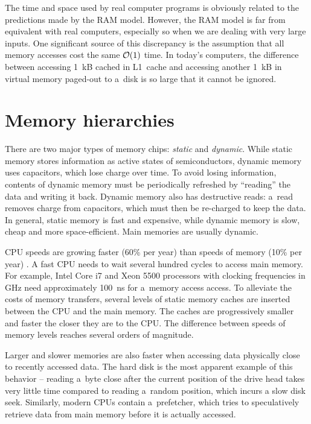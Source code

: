 The time and space used by real computer programs is obviously related
to the predictions made by the RAM model. However, the RAM model is far
from equivalent with real computers, especially so when we are dealing with
very large inputs. One significant source of this discrepancy is the assumption
that all memory accesses cost the same $\mathcal{O}(1)$ time. In today's computers,
the difference between accessing 1~kB cached in L1~cache and accessing
another 1~kB in virtual memory paged-out to a~disk is so large that it cannot
be ignored.

\section{Memory hierarchies}
There are two major types of memory chips: \emph{static} and \emph{dynamic}.
While static memory stores information as active states of semiconductors,
dynamic memory uses capacitors, which lose charge over time. To avoid losing
information, contents of dynamic memory must be periodically refreshed by
``reading'' the data and writing it back. Dynamic memory also has destructive
reads: a~read removes charge from capacitors, which must then be re-charged
to keep the data. In general, static memory is fast and expensive, while dynamic
memory is slow, cheap and more space-efficient. Main memories are usually
dynamic.

CPU speeds are growing faster (60\% per year) than speeds of memory (10\% per
year) \cite{Ailamaki:2004:DAN:1316689.1316801}.
A fast CPU needs to wait several hundred cycles to access main memory.
For example, Intel Core i7 and Xeon 5500 processors with clocking frequencies
in GHz need approximately 100~ns for a~memory access
access\cite{perf-analysis-guide}.
To alleviate the costs of memory transfers, several levels of static memory
caches are inserted between the CPU and the main memory. The caches are
progressively smaller and faster the closer they are to the CPU. The difference
between speeds of memory levels reaches several orders of magnitude.

Larger and slower memories are also faster when accessing data physically
close to recently accessed data. The hard disk is the most apparent example
of this behavior -- reading a~byte close after the current position of the drive
head takes very little time compared to reading a~random position, which incurs
a slow disk seek. %
Similarly, modern CPUs contain a~prefetcher, which tries to speculatively
retrieve data from main memory before it is actually accessed.

